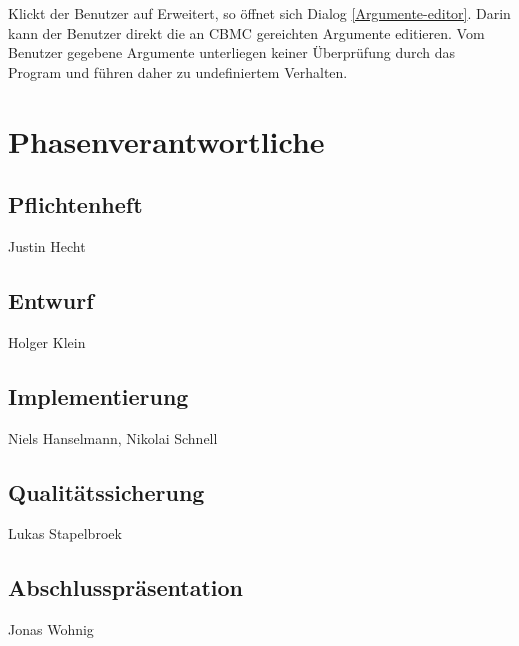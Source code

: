 \documentclass[a4paper]{scrreprt}
\begin{document}
Klickt der \gls{Benutzer} auf Erweitert, so öffnet sich Dialog \ref{Argumente-editor}. Darin kann der \gls{Benutzer} direkt die an \ac{CBMC} gereichten Argumente editieren. Vom \gls{Benutzer} gegebene Argumente unterliegen keiner Überprüfung durch das Program und führen daher zu undefiniertem Verhalten. 

\chapter{Phasenverantwortliche}
\section{Pflichtenheft} Justin Hecht
\section{Entwurf} Holger Klein 
\section{Implementierung} Niels Hanselmann, Nikolai Schnell
\section{Qualitätssicherung} Lukas Stapelbroek
\section{Abschlusspräsentation} Jonas Wohnig


\printglossaries
 

 
\end{document}

